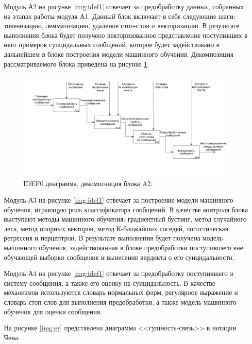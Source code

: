 Модуль А2 на рисунке \ref{img:idef1} отвечает за предобработку данных, собранных на этапах работы модуля А1. 
Данный блок включает в себя следующие шаги: токенизацию, лемматизацию, удаление стоп-слов и векторизацию.
В результате выполнения блока будет получено векторизованное представление поступивших в него примеров суицидальных сообщений, которое будет задействовано в дальнейшем в блоке построения модели машинного обучения.
Декомпозиция рассматриваемого блока приведена на рисунке \ref{img:idef21}.

\begin{figure}[H]
	\centering
	\includegraphics[width=\textwidth]{inc/A21.pdf}
	\caption{ IDEF0 диаграмма, декомпозиция блока A2. }
	\label{img:idef21}
\end{figure}

Модуль А3 на рисунке \ref{img:idef1} отвечает за построение модели машинного обучения, играющую роль классификатора сообщений. 
В качестве контроля блока выступают методы машинного обучения: градиентный бустинг, метод случайного леса, метод опорных векторов, метод К-ближайших соседей, логистическая регрессия и перцептрон.
В результате выполнения будет получена модель машинного обучения, задействованная в блоке предобработки поступившего вне обучающей выборки сообщения и вынесения вердикта о его суицидальности.

Модуль А4 на рисунке \ref{img:idef1} отвечает за предобработку поступившего в систему сообщения, а также его оценку на суицидальность. 
В качестве механизмов используются словарь нормальных форм, регулярное выражение и словарь стоп-слов для выполнения предобработки, а также модель машинного обучения для оценки сообщения.

На рисунке \ref{img:er} представлена диаграмма <<сущность-связь>> в нотации Чена.

